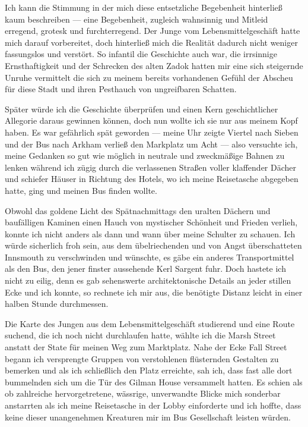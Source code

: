 Ich kann die Stimmung in der mich diese entsetzliche Begebenheit hinterließ kaum beschreiben --- eine Begebenheit, zugleich wahnsinnig und Mitleid erregend, grotesk und furchterregend. Der Junge vom Lebensmittelgeschäft hatte mich darauf vorbereitet, doch hinterließ mich die Realität dadurch nicht weniger fassungslos und verstört. So infantil die Geschichte auch war, die irrsinnige Ernsthaftigkeit und der Schrecken des alten Zadok hatten mir eine sich steigernde Unruhe vermittelt die sich zu meinem bereits vorhandenen Gefühl der Abscheu für diese Stadt und ihren Pesthauch von ungreifbaren Schatten.

Später würde ich die Geschichte überprüfen und einen Kern geschichtlicher Allegorie daraus gewinnen können, doch nun wollte ich sie nur aus meinem Kopf haben. Es war gefährlich spät geworden --- meine Uhr zeigte Viertel nach Sieben und der Bus nach Arkham verließ den Markplatz um Acht --- also versuchte ich, meine Gedanken so gut wie möglich in neutrale und zweckmäßige Bahnen zu lenken während ich zügig durch die verlassenen Straßen voller klaffender Dächer und schiefer Häuser in Richtung des Hotels, wo ich meine Reisetasche abgegeben hatte, ging und meinen Bus finden wollte.

Obwohl das goldene Licht des Spätnachmittags den uralten Dächern und baufälligen Kaminen einen Hauch von mystischer Schönheit und Frieden verlieh, konnte ich nicht anders als dann und wann über meine Schulter zu schauen. Ich würde sicherlich froh sein, aus dem übelriechenden und von Angst überschatteten Innsmouth zu verschwinden und wünschte, es gäbe ein anderes Transportmittel als den Bus, den jener finster aussehende Kerl Sargent fuhr. Doch hastete ich nicht zu eilig, denn es gab sehenswerte architektonische Details an jeder stillen Ecke und ich konnte, so rechnete ich mir aus, die benötigte Distanz leicht in einer halben Stunde durchmessen.

Die Karte des Jungen aus dem Lebensmittelgeschäft studierend und eine Route suchend, die ich noch nicht durchlaufen hatte, wählte ich die Marsh Street anstatt der State für meinen Weg zum Marktplatz. Nahe der Ecke Fall Street begann ich versprengte Gruppen von verstohlenen flüsternden Gestalten zu bemerken und als ich schließlich den Platz erreichte, sah ich, dass fast alle dort bummelnden sich um die Tür des Gilman House versammelt hatten. Es schien als ob zahlreiche hervorgetretene, wässrige, unverwandte Blicke mich sonderbar anstarrten als ich meine Reisetasche in der Lobby einforderte und ich hoffte, dass keine dieser unangenehmen Kreaturen mir im Bus Gesellschaft leisten würden.

